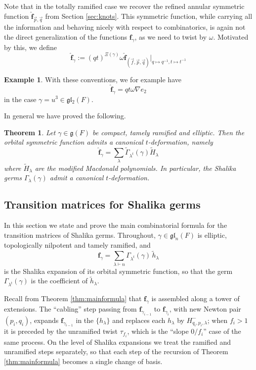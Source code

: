 \documentclass{amsart}
\numberwithin{equation}{section}
\newtheorem{theorem}[lemma]{Theorem}%
\theoremstyle{definition}
\newtheorem{example}[lemma]{Example}%
\def\tilde{\widetilde}
\def\hat{\widehat}
\newcommand{\tH}{\widetilde{H}}
\renewcommand{\th}{\tilde{h}}
\newcommand{\fgamma}{\mathbf{f}_{\gamma}}
\newcommand{\fgl}{\mathfrak{gl}}
\newcommand{\fl}{\mathfrak{l}}
\newcommand{\fg}{\mathfrak{g}}
\newcommand{\fqgamma}{\hat{\mathbf{f}}_\gamma}
\newcommand{\fqrs}{\hat{\mathbf{f}}_{\vec{p},\vec{q}}}
\newcommand{\fqpq}{\fqrs}
\begin{document}
Note that in the totally ramified case we recover the refined annular symmetric function $\fqpq$ from Section \ref{sec:knots}.
This symmetric function, while carrying all the information and behaving nicely with respect to combinatorics, is again not the direct generalization of the functions $\fgamma$, as we need to twist by $\omega$.
Motivated by this, we define 
\begin{equation}
\label{eq:deffgammahat}
    \widehat{\mathbf{f}}_{\gamma}:=(qt)^{\Xi(\gamma)}\omega \widehat{\mathbf{f}}_{(\vec{f},\vec{p},\vec{q})}|_{q\mapsto q^{-1},t\mapsto t^{-1}}
\end{equation}
\begin{example}
    With these conventions, we for example have 
    $$\widehat{\mathbf{f}}_{\gamma}=qt\omega\nabla e_2$$
    in the case $\gamma=u^3\in \fg\fl_2(F)$.
\end{example}
In general we have proved the following.
\begin{theorem}
\label{thm:tdeformation}
Let $\gamma\in \fg(F)$ be compact, tamely ramified and elliptic. Then 
the orbital symmetric function admits a canonical $t$-deformation, namely 
$$\fqgamma=\sum_\lambda \widetilde{\Gamma}_{\lambda^t}(\gamma)\tH_\lambda$$
where $\tH_{\lambda}$ are the modified Macdonald polynomials. In particular, the Shalika germs $\Gamma_\lambda(\gamma)$ admit a canonical $t$-deformation.
\end{theorem}



\subsection{Transition matrices for Shalika germs}
\label{sec:transitionmatrices}
In this section we state and prove the main combinatorial formula for the transition matrices of Shalika germs. Throughout, $\gamma\in\fgl_n(F)$ is elliptic, topologically nilpotent and tamely ramified, and
$$\fgamma=\sum_{\lambda\vdash n} \Gamma_{\lambda^t}(\gamma)\,\th_\lambda$$
is the Shalika expansion of its orbital symmetric function, so that the germ $\Gamma_{\lambda^t}(\gamma)$ is the coefficient of $\th_\lambda$.

Recall from Theorem \ref{thm:mainformula} that $\fgamma$ is assembled along a tower of extensions. The ``cabling'' step passing from $\mathbf{f}_{\gamma_{i-1}}$ to $\mathbf{f}_{\gamma_{i}}$, with new Newton pair $(p_i,q_i)$, expands $\mathbf{f}_{\gamma_{i-1}}$ in the $\{h_\lambda\}$ and replaces each $h_\lambda$ by $H^-_{q_i,p_i,\lambda}$; when $f_i>1$ it is preceded by the unramified twist $\tau_{f_i}$, which is the ``slope $0/f_i$'' case of the same process. On the level of Shalika expansions we treat the ramified and unramified steps separately, so that each step of the recursion of Theorem \ref{thm:mainformula} becomes a single change of basis.
\end{document}
